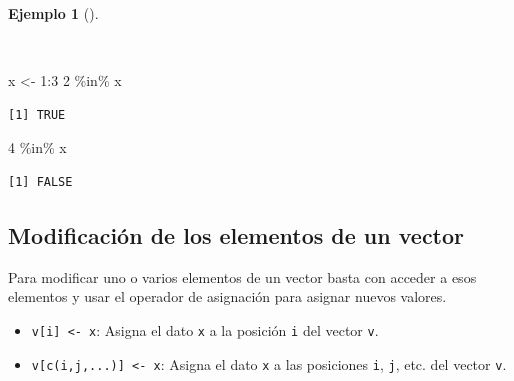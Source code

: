 \documentclass[
  a4paper,
]{scrreport}
\newenvironment{Shaded}{\begin{snugshade}}{\end{snugshade}}
\newcommand{\DecValTok}[1]{\textcolor[rgb]{0.68,0.00,0.00}{#1}}
\newcommand{\NormalTok}[1]{\textcolor[rgb]{0.00,0.23,0.31}{#1}}
\newcommand{\OtherTok}[1]{\textcolor[rgb]{0.00,0.23,0.31}{#1}}
\newcommand{\SpecialCharTok}[1]{\textcolor[rgb]{0.37,0.37,0.37}{#1}}
\providecommand{\tightlist}{%
  \setlength{\itemsep}{0pt}\setlength{\parskip}{0pt}}\usepackage{longtable,booktabs,array}
\theoremstyle{definition}
\theoremstyle{definition}
\newtheorem{example}{Ejemplo}[chapter]
\theoremstyle{remark}
\begin{document}
\begin{example}[]\protect\hypertarget{exm-pertenencia-vector}{}\label{exm-pertenencia-vector}

~

\begin{Shaded}
\begin{Highlighting}[]
\NormalTok{x }\OtherTok{\textless{}{-}} \DecValTok{1}\SpecialCharTok{:}\DecValTok{3}
\DecValTok{2} \SpecialCharTok{\%in\%}\NormalTok{ x}
\end{Highlighting}
\end{Shaded}

\begin{verbatim}
[1] TRUE
\end{verbatim}

\begin{Shaded}
\begin{Highlighting}[]
\DecValTok{4} \SpecialCharTok{\%in\%}\NormalTok{ x}
\end{Highlighting}
\end{Shaded}

\begin{verbatim}
[1] FALSE
\end{verbatim}

\end{example}

\subsection{Modificación de los elementos de un
vector}\label{modificaciuxf3n-de-los-elementos-de-un-vector}

Para modificar uno o varios elementos de un vector basta con acceder a
esos elementos y usar el operador de asignación para asignar nuevos
valores.

\begin{itemize}
\tightlist
\item
  \texttt{v{[}i{]}\ \textless{}-\ x}: Asigna el dato \texttt{x} a la
  posición \texttt{i} del vector \texttt{v}.
\item
  \texttt{v{[}c(i,j,...){]}\ \textless{}-\ x}: Asigna el dato \texttt{x}
  a las posiciones \texttt{i}, \texttt{j}, etc. del vector \texttt{v}.
\end{itemize}
\end{document}
